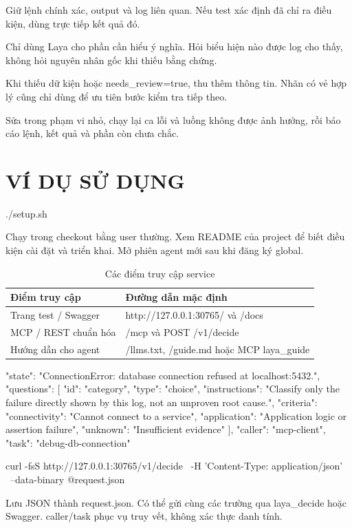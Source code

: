 \documentclass[10pt,a4paper]{article}
\begin{document}
Giữ lệnh chính xác, output và log liên quan. Nếu test xác định đã chỉ ra điều kiện, dùng trực tiếp kết quả đó.

Chỉ dùng Laya cho phần cần hiểu ý nghĩa. Hỏi biểu hiện nào được log cho thấy, không hỏi nguyên nhân gốc khi thiếu bằng chứng.

Khi thiếu dữ kiện hoặc needs\_review=true, thu thêm thông tin. Nhãn có vẻ hợp lý cũng chỉ dùng để ưu tiên bước kiểm tra tiếp theo.

Sửa trong phạm vi nhỏ, chạy lại ca lỗi và luồng không được ảnh hưởng, rồi báo cáo lệnh, kết quả và phần còn chưa chắc.

\section{VÍ DỤ SỬ DỤNG}
\begin{Code}
./setup.sh
\end{Code}
Chạy trong checkout bằng user thường. Xem README của project để biết điều kiện cài đặt và triển khai. Mở phiên agent mới sau khi đăng ký global.

\begin{table}[H]
\centering\small
\renewcommand{\arraystretch}{1.15}
\begin{tabularx}{\linewidth}{@{}YY@{}}
\toprule
\textbf{Điểm truy cập} & \textbf{Đường dẫn mặc định} \\
\midrule
Trang test / Swagger & http://127.0.0.1:30765/  và  /docs \\
MCP / REST chuẩn hóa & /mcp  và  POST /v1/decide \\
Hướng dẫn cho agent & /llms.txt, /guide.md hoặc MCP laya\_guide \\
\bottomrule
\end{tabularx}
\caption{Các điểm truy cập service}
\end{table}
\begin{Code}
{
  "state": "ConnectionError: database connection refused at localhost:5432.",
  "questions": [{
    "id": "category", "type": "choice",
    "instructions":
      "Classify only the failure directly shown by this log, not an unproven root cause.",
    "criteria": {
      "connectivity": "Cannot connect to a service",
      "application": "Application logic or assertion failure",
      "unknown": "Insufficient evidence"
    }
  }],
  "caller": "mcp-client", "task": "debug-db-connection"
}
\end{Code}
\begin{Code}
curl -fsS http://127.0.0.1:30765/v1/decide \
  -H 'Content-Type: application/json' \
  --data-binary @request.json
\end{Code}
Lưu JSON thành request.json. Có thể gửi cùng các trường qua laya\_decide hoặc Swagger. caller/task phục vụ truy vết, không xác thực danh tính.
\end{document}
